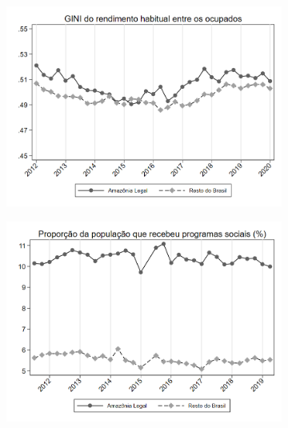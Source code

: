 \documentclass[11pt]{beamer}
\begin{document}
\begin{frame}
\begin{figure}[h!tpb]
\begin{subfigure}{.5\textwidth}
  \centering
  \includegraphics[width=.95\linewidth]{../../analysis/output/estrutura_renda/_estrutura_renda_gini_ocupado.png}
  \label{fig:_estrutura_renda_gini_ocupado}
\end{subfigure}%
\begin{subfigure}{.5\textwidth}
  \centering
  \includegraphics[width=.95\linewidth]{../../analysis/output/programas_sociais/_programas_sociais_prop_ajuda_gov.png}
  \label{fig:_programas_sociais_prop_ajuda_gov}
\end{subfigure}

\label{fig:estrutura_renda}
\end{figure}
\end{frame}


%
\end{document}
